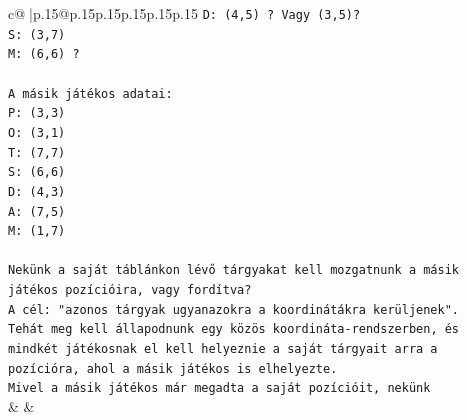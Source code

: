 \documentclass{article}
\begin{document}
{\begin{supertabular}{c@{$\;$}|p{.15\linewidth}@{}p{.15\linewidth}p{.15\linewidth}p{.15\linewidth}p{.15\linewidth}p{.15\linewidth}}
{{{\texttt{D: (4,5) ? Vagy (3,5)?} \\
\texttt{S: (3,7)} \\
\texttt{M: (6,6) ?} \\
\\ 
\texttt{A másik játékos adatai:} \\
\texttt{P: (3,3)} \\
\texttt{O: (3,1)} \\
\texttt{T: (7,7)} \\
\texttt{S: (6,6)} \\
\texttt{D: (4,3)} \\
\texttt{A: (7,5)} \\
\texttt{M: (1,7)} \\
\\ 
\texttt{Nekünk a saját táblánkon lévő tárgyakat kell mozgatnunk a másik játékos pozícióira, vagy fordítva?} \\
\texttt{A cél: "azonos tárgyak ugyanazokra a koordinátákra kerüljenek".} \\
\texttt{Tehát meg kell állapodnunk egy közös koordináta{-}rendszerben, és mindkét játékosnak el kell helyeznie a saját tárgyait arra a pozícióra, ahol a másik játékos is elhelyezte.} \\
\texttt{Mivel a másik játékos már megadta a saját pozícióit, nekünk} \\
            }
        }
    }
    & & \\ \\


\end{supertabular}}
\end{document}
